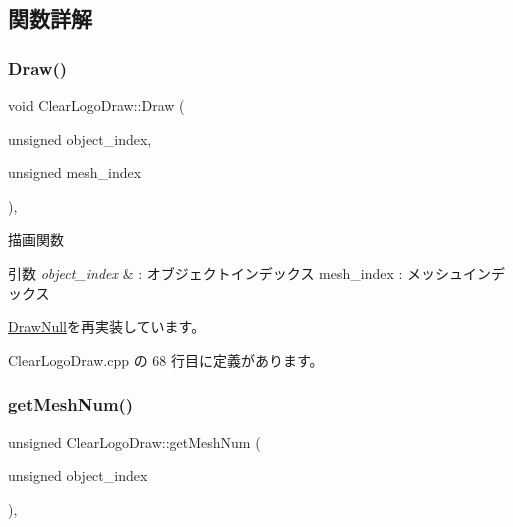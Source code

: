 \subsection{関数詳解}
\mbox{\label{class_clear_logo_draw_ab018f370071f370ae7016d8ee402c456}} 
\subsubsection{\texorpdfstring{Draw()}{Draw()}}
{\footnotesize\ttfamily void Clear\+Logo\+Draw\+::\+Draw (\begin{DoxyParamCaption}\item[{unsigned}]{object\+\_\+index,  }\item[{unsigned}]{mesh\+\_\+index }\end{DoxyParamCaption})\hspace{0.3cm}{\ttfamily [override]}, {\ttfamily [virtual]}}



描画関数 


\begin{DoxyParams}{引数}
{\em object\+\_\+index} & \+: オブジェクトインデックス mesh\+\_\+index \+: メッシュインデックス \\
\hline
\end{DoxyParams}


\mbox{\hyperlink{class_draw_null_afe50f6fd820b18d673f70f048743f339}{Draw\+Null}}を再実装しています。



 Clear\+Logo\+Draw.\+cpp の 68 行目に定義があります。

\mbox{\label{class_clear_logo_draw_a257f34e6f8325580f7df835f20d2ebb4}} 
\subsubsection{\texorpdfstring{get\+Mesh\+Num()}{getMeshNum()}}
{\footnotesize\ttfamily unsigned Clear\+Logo\+Draw\+::get\+Mesh\+Num (\begin{DoxyParamCaption}\item[{unsigned}]{object\+\_\+index }\end{DoxyParamCaption})\hspace{0.3cm}{\ttfamily [override]}, {\ttfamily [virtual]}}



